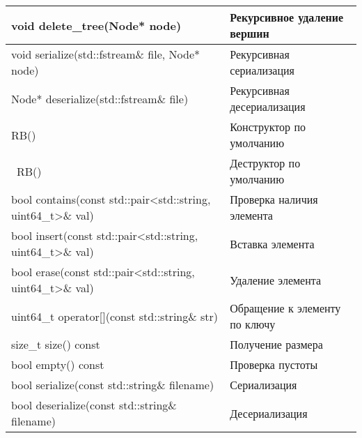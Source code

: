 \begin{longtable}{|p{7.5cm}|p{7.5cm}|}
\hline
void delete\_tree(Node* node)&Рекурсивное удаление вершин\\
\hline
void serialize(std::fstream\& file, Node* node)&Рекурсивная сериализация\\
\hline
Node* deserialize(std::fstream\& file)&Рекурсивная десериализация\\
\hline
RB()&Конструктор по умолчанию\\
\hline
~RB()&Деструктор по умолчанию\\
\hline
bool contains(const std::pair<std::string, uint64\_t>\& val)&Проверка наличия элемента\\
\hline
bool insert(const std::pair<std::string, uint64\_t>\& val)&Вставка элемента\\
\hline
bool erase(const std::pair<std::string, uint64\_t>\& val)&Удаление элемента\\
\hline
uint64\_t operator[](const std::string\& str)&Обращение к элементу по ключу\\
\hline
size\_t size() const&Получение размера\\
\hline
bool empty() const&Проверка пустоты\\
\hline
bool serialize(const std::string\& filename)&Сериализация\\
\hline
bool deserialize(const std::string\& filename)&Десериализация\\
\hline

\end{longtable}
